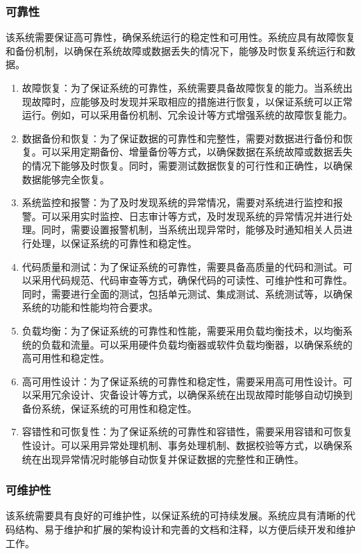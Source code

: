 \documentclass[UTF8]{ctexart}
\newcommand{\m}[1]{\textcolor{modify}{#1}}
\begin{document}
    \subsubsection{可靠性}
    该系统需要保证高可靠性，确保系统运行的稳定性和可用性。系统应具有故障恢复和备份机制，以确保在系统故障或数据丢失的情况下，能够及时恢复系统运行和数据。
    \m{
        \begin{enumerate}
            \item 故障恢复：为了保证系统的可靠性，系统需要具备故障恢复的能力。当系统出现故障时，应能够及时发现并采取相应的措施进行恢复，以保证系统可以正常运行。例如，可以采用备份机制、冗余设计等方式增强系统的故障恢复能力。
            \item 数据备份和恢复：为了保证数据的可靠性和完整性，需要对数据进行备份和恢复。可以采用定期备份、增量备份等方式，以确保数据在系统故障或数据丢失的情况下能够及时恢复。同时，需要测试数据恢复的可行性和正确性，以确保数据能够完全恢复。
            \item 系统监控和报警：为了及时发现系统的异常情况，需要对系统进行监控和报警。可以采用实时监控、日志审计等方式，及时发现系统的异常情况并进行处理。同时，需要设置报警机制，当系统出现异常时，能够及时通知相关人员进行处理，以保证系统的可靠性和稳定性。
            \item 代码质量和测试：为了保证系统的可靠性，需要具备高质量的代码和测试。可以采用代码规范、代码审查等方式，确保代码的可读性、可维护性和可靠性。同时，需要进行全面的测试，包括单元测试、集成测试、系统测试等，以确保系统的功能和性能均符合要求。
            \item 负载均衡：为了保证系统的可靠性和性能，需要采用负载均衡技术，以均衡系统的负载和流量。可以采用硬件负载均衡器或软件负载均衡器，以确保系统的高可用性和稳定性。
            \item 高可用性设计：为了保证系统的可靠性和稳定性，需要采用高可用性设计。可以采用冗余设计、灾备设计等方式，以确保系统在出现故障时能够自动切换到备份系统，保证系统的可用性和稳定性。
            \item 容错性和可恢复性：为了保证系统的可靠性和容错性，需要采用容错和可恢复性设计。可以采用异常处理机制、事务处理机制、数据校验等方式，以确保系统在出现异常情况时能够自动恢复并保证数据的完整性和正确性。
        \end{enumerate}
    }
    \subsubsection{可维护性}
    该系统需要具有良好的可维护性，以保证系统的可持续发展。系统应具有清晰的代码结构、易于维护和扩展的架构设计和完善的文档和注释，以方便后续开发和维护工作。
    
\end{document}
